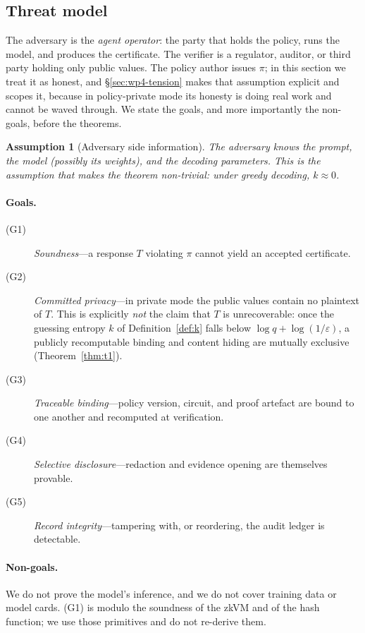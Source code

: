 \documentclass[10pt,journal,compsoc]{IEEEtran}
\newtheorem{assumption}[theorem]{Assumption}
\begin{document}
\subsection{Threat model}
\label{sec:threat}

The adversary is the \emph{agent operator}: the party that holds the policy, runs
the model, and produces the certificate. The verifier is a regulator, auditor, or
third party holding only public values. The policy author issues $\pi$; in this
section we treat it as honest, and \S\ref{sec:wp4-tension} makes that assumption
explicit and scopes it, because in policy-private mode its honesty is doing real
work and cannot be waved through. We state the goals, and more importantly the
non-goals, before the theorems.

\begin{assumption}[Adversary side information]
\label{as:Z}
The adversary knows the prompt, the model (possibly its weights), and the
decoding parameters. \emph{This is the assumption that makes the theorem
non-trivial}: under greedy decoding, $k \approx 0$.
\end{assumption}

\paragraph{Goals.}
\begin{description}
  \item[(G1)] \emph{Soundness}---a response $T$ violating $\pi$ cannot yield an
  accepted certificate.
  \item[(G2)] \emph{Committed privacy}---in private mode the public values
  contain no plaintext of $T$. This is explicitly \emph{not} the claim that $T$
  is unrecoverable: once the guessing entropy $k$ of Definition~\ref{def:k} falls
  below $\log q + \log(1/\varepsilon)$, a publicly recomputable binding and
  content hiding are mutually exclusive (Theorem~\ref{thm:t1}).
  \item[(G3)] \emph{Traceable binding}---policy version, circuit, and proof
  artefact are bound to one another and recomputed at verification.
  \item[(G4)] \emph{Selective disclosure}---redaction and evidence opening are
  themselves provable.
  \item[(G5)] \emph{Record integrity}---tampering with, or reordering, the audit
  ledger is detectable.
\end{description}

\paragraph{Non-goals.} We do not prove the model's inference, and we do not cover
training data or model cards. (G1) is modulo the soundness of the zkVM and of the
hash function; we use those primitives and do not re-derive them.
\end{document}
